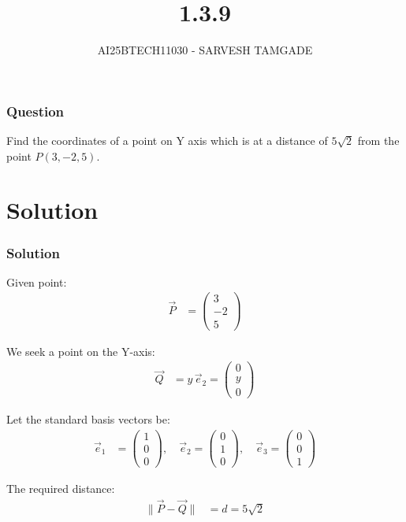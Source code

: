 \documentclass{beamer}
\title{1.3.9}
\author{AI25BTECH11030 - SARVESH TAMGADE}
\theoremstyle{remark}
\numberwithin{equation}{section}
\numberwithin{equation}{section}
\begin{document}
\begin{frame}
\titlepage
\end{frame}

\begin{frame}
\frametitle{Question}

Find the coordinates of a point on Y axis which is at a distance of \( 5\sqrt{2} \) from the point \( P(3, -2, 5) \).

\end{frame}

\section{Solution}

\begin{frame}
\frametitle{Solution}
Given point:
\begin{align}
\vec{P} &= \begin{pmatrix} 3 \\ -2 \\ 5 \end{pmatrix}
\end{align}

We seek a point on the Y-axis:
\begin{align}
\vec{Q} &= y\,\vec{e}_2 = \begin{pmatrix} 0 \\ y \\ 0 \end{pmatrix}
\end{align}

Let the standard basis vectors be:
\begin{align}
\vec{e}_1 &= \begin{pmatrix} 1 \\ 0 \\ 0 \end{pmatrix}, \quad
\vec{e}_2 = \begin{pmatrix} 0 \\ 1 \\ 0 \end{pmatrix}, \quad
\vec{e}_3 = \begin{pmatrix} 0 \\ 0 \\ 1 \end{pmatrix}
\end{align}

The required distance:
\begin{align}
\|\vec{P} - \vec{Q}\| &= d = 5\sqrt{2}
\end{align}
\end{frame}
\end{document}
